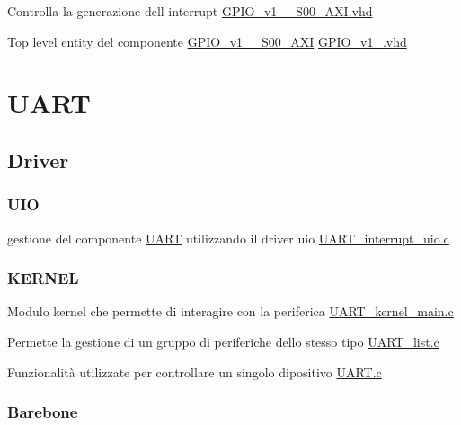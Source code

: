 \begin{DoxyItemize}
\item Controlla la generazione dell\textquotesingle{} interrupt \hyperlink{GPIO__v1__0__S00__AXI_8vhd}{G\+P\+I\+O\+\_\+v1\+\_\+\_\+\+S00\+\_\+\+A\+X\+I.\+vhd}
\item Top level entity del componente \hyperlink{classGPIO__v1__0__S00__AXI}{G\+P\+I\+O\+\_\+v1\+\_\+\_\+\+S00\+\_\+\+A\+XI} \hyperlink{GPIO__v1__0_8vhd}{G\+P\+I\+O\+\_\+v1\+\_.\+vhd} 
\end{DoxyItemize}\hypertarget{index_UART}{}\section{U\+A\+RT}\label{index_UART}
\hypertarget{index_Driver}{}\subsection{Driver}\label{index_Driver}
\hypertarget{index_UIO}{}\subsubsection{U\+IO}\label{index_UIO}

\begin{DoxyItemize}
\item gestione del componente \hyperlink{structUART}{U\+A\+RT} utilizzando il driver uio \hyperlink{UART__interrupt__uio_8c}{U\+A\+R\+T\+\_\+interrupt\+\_\+uio.\+c} 
\end{DoxyItemize}\hypertarget{index_KERNEL}{}\subsubsection{K\+E\+R\+N\+EL}\label{index_KERNEL}

\begin{DoxyItemize}
\item Modulo kernel che permette di interagire con la periferica \hyperlink{UART__kernel__main_8c}{U\+A\+R\+T\+\_\+kernel\+\_\+main.\+c}
\item Permette la gestione di un gruppo di periferiche dello stesso tipo \hyperlink{UART__list_8c}{U\+A\+R\+T\+\_\+list.\+c}
\item Funzionalità utilizzate per controllare un singolo dipositivo \hyperlink{UART_8c}{U\+A\+R\+T.\+c} 
\end{DoxyItemize}\hypertarget{index_Barebone}{}\subsubsection{Barebone}\label{index_Barebone}

